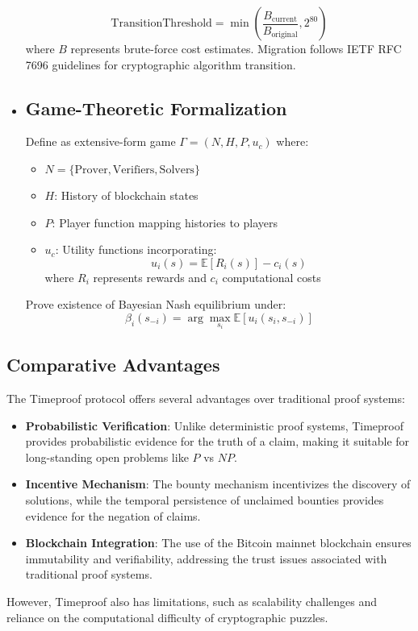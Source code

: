 \documentclass[12pt]{report}
\begin{document}
\begin{itemize}
\begin{equation*}
        \text{TransitionThreshold} = \min\left(\frac{B_{\text{current}}}{B_{\text{original}}}, 2^{80}\right)
    \end{equation*}
    where $B$ represents brute-force cost estimates. Migration follows IETF RFC 7696 \cite{Housley2015} guidelines for cryptographic algorithm transition.
    \item \subsection{Game-Theoretic Formalization}
    Define as extensive-form game $\Gamma = (N, H, P, u_c)$ where:
    \begin{itemize}
        \item $N = \{\text{Prover}, \text{Verifiers}, \text{Solvers}\}$
        \item $H$: History of blockchain states
        \item $P$: Player function mapping histories to players
        \item $u_c$: Utility functions incorporating:
        \begin{equation*}
            u_i(s) = \mathbb{E}[R_i(s)] - c_i(s)
        \end{equation*}
        where $R_i$ represents rewards and $c_i$ computational costs
    \end{itemize}
    Prove existence of Bayesian Nash equilibrium under:
    \begin{equation*}
        \beta_i(s_{-i}) = \arg\max_{s_i} \mathbb{E}[u_i(s_i, s_{-i})]
    \end{equation*}
\end{itemize}

\subsection{Comparative Advantages}
The Timeproof protocol offers several advantages over traditional proof systems:
\begin{itemize}
    \item \textbf{Probabilistic Verification}: Unlike deterministic proof systems, Timeproof provides probabilistic evidence for the truth of a claim, making it suitable for long-standing open problems like \( P \) vs \( NP \).
    \item \textbf{Incentive Mechanism}: The bounty mechanism incentivizes the discovery of solutions, while the temporal persistence of unclaimed bounties provides evidence for the negation of claims.
    \item \textbf{Blockchain Integration}: The use of the Bitcoin mainnet blockchain ensures immutability and verifiability, addressing the trust issues associated with traditional proof systems.
\end{itemize}
However, Timeproof also has limitations, such as scalability challenges and reliance on the computational difficulty of cryptographic puzzles.
\end{document}
